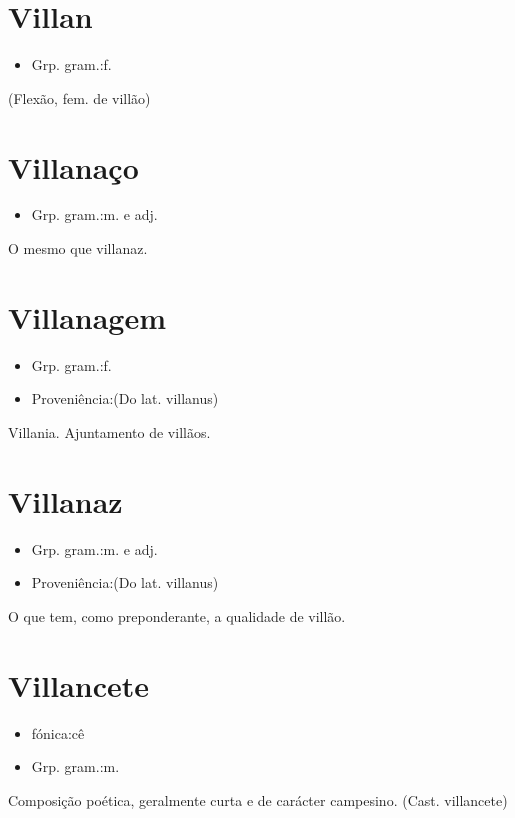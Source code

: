 \documentclass{article}
\begin{document}
\section{Villan}
\begin{itemize}
\item {Grp. gram.:f.}
\end{itemize}
(Flexão, fem. de \textunderscore villão\textunderscore )
\section{Villanaço}
\begin{itemize}
\item {Grp. gram.:m.  e  adj.}
\end{itemize}
O mesmo que \textunderscore villanaz\textunderscore .
\section{Villanagem}
\begin{itemize}
\item {Grp. gram.:f.}
\end{itemize}
\begin{itemize}
\item {Proveniência:(Do lat. \textunderscore villanus\textunderscore )}
\end{itemize}
Villania.
Ajuntamento de villãos.
\section{Villanaz}
\begin{itemize}
\item {Grp. gram.:m.  e  adj.}
\end{itemize}
\begin{itemize}
\item {Proveniência:(Do lat. \textunderscore villanus\textunderscore )}
\end{itemize}
O que tem, como preponderante, a qualidade de villão.
\section{Villancete}
\begin{itemize}
\item {fónica:cê}
\end{itemize}
\begin{itemize}
\item {Grp. gram.:m.}
\end{itemize}
Composição poética, geralmente curta e de carácter campesino.
(Cast. \textunderscore villancete\textunderscore )
\end{document}
